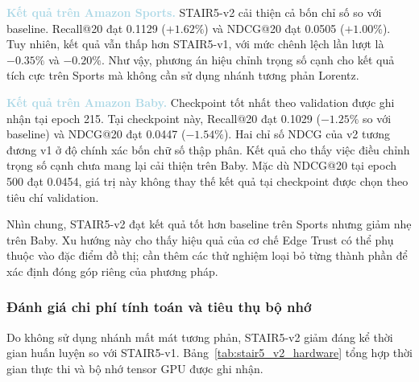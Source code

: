 \noindent\textcolor{lightblue}{\textbf{Kết quả trên Amazon Sports.}}
STAIR5-v2 cải thiện cả bốn chỉ số so với baseline.
Recall@20 đạt 0.1129 ($+1.62\%$)
và NDCG@20 đạt 0.0505 ($+1.00\%$).
Tuy nhiên, kết quả vẫn thấp hơn STAIR5-v1,
với mức chênh lệch lần lượt là $-0.35\%$
và $-0.20\%$.
Như vậy, phương án hiệu chỉnh trọng số cạnh
cho kết quả tích cực trên Sports
mà không cần sử dụng nhánh tương phản Lorentz.

\noindent\textcolor{lightblue}{\textbf{Kết quả trên Amazon Baby.}}
Checkpoint tốt nhất theo validation được ghi nhận
tại epoch 215.
Tại checkpoint này,
Recall@20 đạt 0.1029 ($-1.25\%$ so với baseline)
và NDCG@20 đạt 0.0447 ($-1.54\%$).
Hai chỉ số NDCG của v2 tương đương v1
ở độ chính xác bốn chữ số thập phân.
Kết quả cho thấy việc điều chỉnh trọng số cạnh
chưa mang lại cải thiện trên Baby.
Mặc dù NDCG@20 tại epoch 500 đạt 0.0454,
giá trị này không thay thế kết quả tại checkpoint
được chọn theo tiêu chí validation.

Nhìn chung, STAIR5-v2 đạt kết quả tốt hơn baseline
trên Sports nhưng giảm nhẹ trên Baby.
Xu hướng này cho thấy hiệu quả của cơ chế Edge Trust
có thể phụ thuộc vào đặc điểm đồ thị;
cần thêm các thử nghiệm loại bỏ từng thành phần
để xác định đóng góp riêng của phương pháp.



\subsubsection{Đánh giá chi phí tính toán và tiêu thụ bộ nhớ}

Do không sử dụng nhánh mất mát tương phản,
STAIR5-v2 giảm đáng kể thời gian huấn luyện
so với STAIR5-v1.
Bảng~\ref{tab:stair5_v2_hardware}
tổng hợp thời gian thực thi
và bộ nhớ tensor GPU được ghi nhận.

